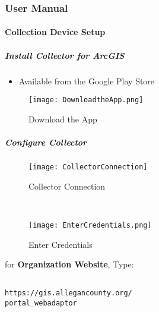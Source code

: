  \subsubsection[User Manual]{\Large User Manual}
 \paragraph{Collection Device Setup}
 \subparagraph{Install Collector for ArcGIS}
 \begin{itemize}
 \item Available from the Google Play Store
 \end{itemize}
 \begin{figure}[h!]
 \centering
     \texttt{[image: DownloadtheApp.png]}
 \caption{Download the App}
 \end{figure}
 \clearpage
 \subparagraph[Configure Collector]{\Large Configure Collector}
 \begin{wrapfigure}{r}{0.5\textwidth}
 \centering
 \texttt{[image: CollectorConnection]}
 \caption{Collector Connection}

 \HRule \\[.4cm] %
 \vspace{.1in}

     \texttt{[image: EnterCredentials.png]}
 \vspace{-.1in}

 \caption{Enter Credentials}
 \end{wrapfigure}


 for \textbf{Organization Website}, Type:
 \vspace{.25in}

\begin{verbatim}

https://gis.allegancounty.org/
portal_webadaptor

\end{verbatim}

 \vspace{.5in}

\vspace{2.75in}

 \vspace{1in}

